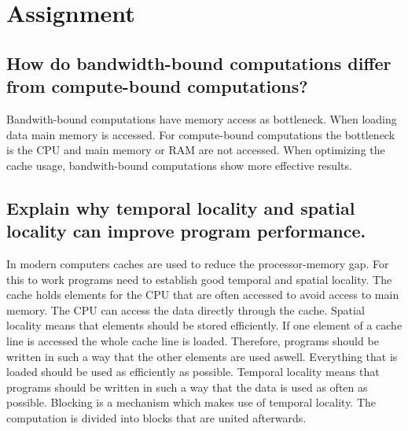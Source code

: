 \documentclass[runningheads]{llncs}
\begin{document}
\section{Assignment}

\subsection{How do bandwidth-bound computations differ from compute-bound computations?}
Bandwith-bound computations have memory access as bottleneck. When loading data main memory is accessed.
For compute-bound computations the bottleneck is the CPU and main memory or RAM are not accessed.
When optimizing the cache usage, bandwith-bound computations show more effective results. 






\subsection{Explain why temporal locality and spatial locality can improve program performance.}
In modern computers caches are used to reduce the processor-memory gap.
For this to work programs need to establish good temporal and spatial locality.
The cache holds elements for the CPU that are often accessed to avoid access to main memory.
The CPU can access the data directly through the cache.
Spatial locality means that elements should be stored efficiently. 
If one element of a cache line is accessed the whole cache line is loaded.
Therefore, programs should be written in such a way that the other elements are used aswell.
Everything that is loaded should be used as efficiently as possible.
Temporal locality means that programs should be written in such a way that the data is used as often as possible.
Blocking is a mechanism which makes use of temporal locality. 
The computation is divided into blocks that are united afterwards.
\end{document}
